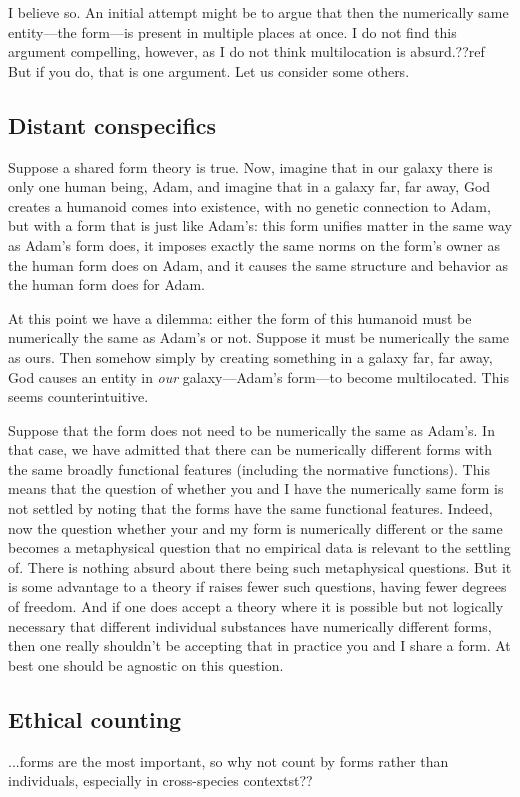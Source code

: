 I believe so. An initial attempt might be to argue that then the numerically same entity---the form---is present in multiple
places at once. I do not find this argument compelling, however, as I do not think multilocation is absurd.??ref But if you
do, that is one argument. Let us consider some others.

\subsection{Distant conspecifics}
Suppose a shared form theory is true. Now, imagine that in our galaxy there is only one human being, Adam, and imagine that in 
a galaxy far, far away, God creates a humanoid comes into existence, with no genetic connection to Adam, but with a form that 
is just like Adam's: this form unifies matter in the same way as
Adam's form does, it imposes exactly the same norms on the form's owner as the human form does on Adam, and it causes the same
structure and behavior as the human form does for Adam. 

At this point we have a dilemma: either the form of this humanoid must be numerically the same as Adam's or not. Suppose it 
must be numerically the same as ours. Then somehow simply by creating something in a galaxy far, far away, God causes an
entity in \textit{our} galaxy---Adam's form---to become multilocated. This seems counterintuitive. 

Suppose that the form does not need to be numerically the same as Adam's. In that case, we have admitted that there can 
be numerically different forms with the same broadly functional features (including the normative functions). This 
means that the question of whether you and I have the  numerically same form is not settled by noting that the forms have 
the same functional features. Indeed, now the question whether your and my form is numerically different or the same becomes
a metaphysical question that no empirical data is relevant to the settling of. There is nothing absurd about there being
such metaphysical questions. But it is some advantage to a theory if raises fewer such questions, having fewer degrees of 
freedom. And if one does accept a theory where it is possible but not logically necessary that different individual substances
have numerically different forms, then one really shouldn't be accepting that in practice you and I share a form. At best
one should be agnostic on this question.

\subsection{Ethical counting}
...forms are the most important, so why not count by forms rather than individuals, especially in cross-species contextst??

\chaptertail
